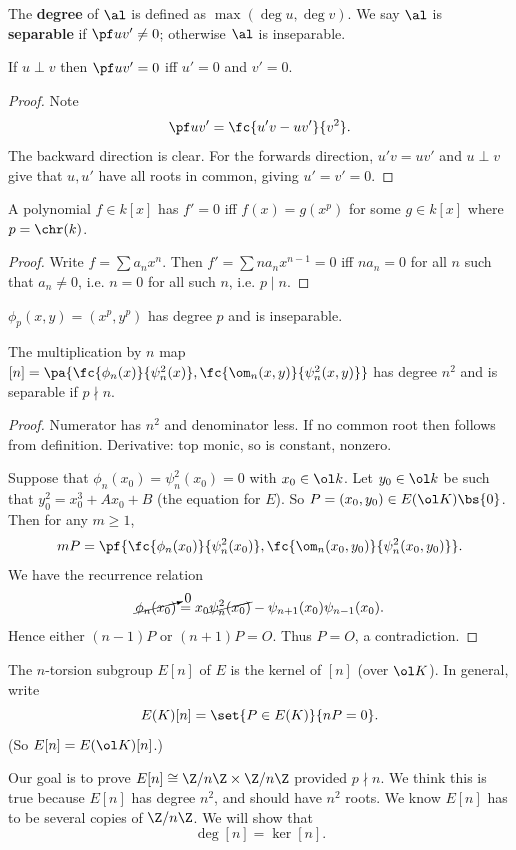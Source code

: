 \begin{df}
The \textbf{degree} of $\al$ is defined as $\max(\deg u,\deg v)$. We say $\al$ is \textbf{separable} if $\pf uv'\ne 0$;
 otherwise $\al$ is inseparable.
\end{df}
\begin{lem}
If $u\perp v$ then $\pf uv'=0$ iff $u'=0$ and $v'=0$.
\end{lem}
\begin{proof}
Note
\[
\pf uv'=\fc{u'v-uv'}{v^2}.
\]
The backward direction is clear. For the forwards direction, $u'v=uv'$ and $u\perp v$ give that $u,u'$ have all roots in common, giving $u'=v'=0$.
\end{proof}
\begin{lem}
A polynomial $f\in k[x]$ has $f'=0$ iff $f(x)=g(x^p)$ for some $g\in k[x]$ where $p=\chr(k)$.
\end{lem}
\begin{proof}
Write $f=\sum a_nx^n$. Then $f'=\sum na_nx^{n-1}=0$ iff $na_n=0$ for all $n$ such that $a_n\ne 0$, i.e. $n=0$ for all such $n$, i.e. $p\mid n$.
\end{proof}
\begin{ex}
$\phi_p(x,y)=(x^p,y^p)$ has degree $p$ and is inseparable.
\end{ex}
\begin{thm}
The multiplication by $n$ map $[n]=\pa{\fc{\phi_n(x)}{\psi_n^2(x)},\fc{\om_n(x,y)}{\psi_n^2(x,y)}}$ has degree $n^2$ and is separable if $p\nmid n$. 
\end{thm}
\begin{proof}
Numerator has $n^2$ and denominator less. If no common root then follows from definition. Derivative: top monic, so is constant, nonzero.

Suppose that $\phi_n(x_0)=\psi_n^2(x_0)=0$ with $x_0\in \ol k$. Let $y_0\in \ol k$ be such that $y_0^2=x_0^3+Ax_0+B$ (the equation for $E$). So $P=(x_0,y_0)\in E(\ol K)\bs\{0\}$.
Then for any $m\ge 1$, 
\[
mP=\pf{\fc{\phi_n(x_0)}{\psi_n^2(x_0)},\fc{\om_n(x_0,y_0)}{\psi_n^2(x_0,y_0)}}.
\]
We have the recurrence relation
\[
\cancelto{0}{\phi_n(x_0)}=x_0\cancel{\psi_n^2(x_0)}-\psi_{n+1}(x_0)\psi_{n-1}(x_0).
\]
Hence either $(n-1)P$ or $(n+1)P=O$. 
Thus $P=O$, a contradiction.
\end{proof}
\begin{df}
The $n$-torsion subgroup $E[n]$ of $E$ is the kernel of $[n]$ (over $\ol K$). In general, write
\[
E(K)[n]=\set{P\in E(K)}{nP=0}.
\]
(So $E[n]=E(\ol K)[n]$.)
\end{df}
Our goal is to prove $E[n]\cong \Z/n\Z\times \Z/n\Z$ provided $p\nmid n$. We think this is true because $E[n]$ has degree $n^2$, and should have $n^2$ roots. We know $E[n]$ has to be several copies of $\Z/n\Z$. 
We will show that
\[
\deg[n]=\ker[n].
\]


